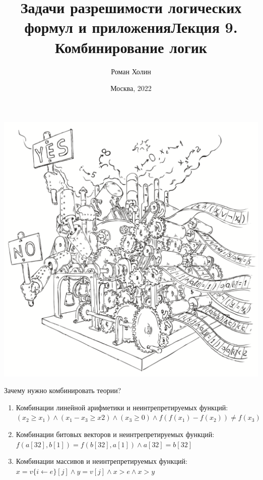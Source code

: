 \documentclass{beamer}
\begin{document}
\title{Задачи разрешимости логических формул и приложения\newline Лекция 9. Комбинирование логик}
\author{Роман Холин}
\date{Москва, 2022}

\begin{frame}
\includegraphics[scale=0.5]{../decision-procedure.png}
\end{frame}

\frame{\titlepage}

\begin{frame}{Зачему нужно комбинировать теории?}
\begin{enumerate}
\item Комбинации линейной арифметики и неинтрепретируемых функций:\newline
$(x_2 \ge x_1 ) \wedge (x_1 - x_3 \ge x 2 ) \wedge (x_3 \ge 0) \wedge f(f(x_1) - f(x_2)) \ne f(x_3)$
\item Комбинации битовых векторов и неинтрепретируемых функций:\newline
$f(a[32], b[1]) = f (b[32], a[1]) \wedge a[32] = b[32]$
\item Комбинации массивов и неинтрепретируемых функций:
$x = v\{i \leftarrow e\}[j] \wedge y = v[j] \wedge x > e \wedge x > y$
\end{enumerate}
\end{frame}
\end{document}
